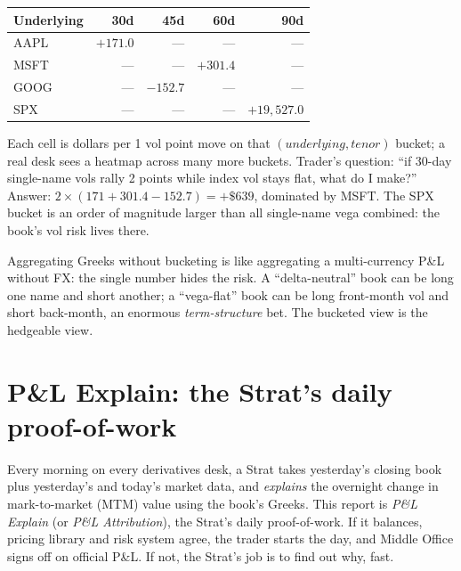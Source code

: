 \begin{center}
\small
\begin{tabular}{@{}lrrrr@{}}
\toprule
Underlying & 30d & 45d & 60d & 90d \\
\midrule
AAPL & $+171.0$ & --- & --- & --- \\
MSFT & --- & --- & $+301.4$ & --- \\
GOOG & --- & $-152.7$ & --- & --- \\
SPX  & --- & --- & --- & $+19{,}527.0$ \\
\bottomrule
\end{tabular}
\end{center}

Each cell is dollars per 1 vol point move on that
$(underlying, tenor)$ bucket; a real desk sees a heatmap across
many more buckets.  Trader's question: ``if 30-day single-name
vols rally 2 points while index vol stays flat, what do I make?''
Answer: $2 \times (171 + 301.4 - 152.7) = +\$639$, dominated by
MSFT.  The SPX bucket is an order of magnitude larger than all
single-name vega combined: the book's vol risk lives there.

\begin{intuitionbox}
Aggregating Greeks without bucketing is like aggregating a
multi-currency P\&L without FX: the single number hides the
risk.  A ``delta-neutral'' book can be long one name and short
another; a ``vega-flat'' book can be long front-month vol and short
back-month, an enormous \emph{term-structure} bet.  The bucketed
view is the hedgeable view.
\end{intuitionbox}


\section{P\&L Explain: the Strat's daily proof-of-work}
\label{sec:pnl_explain}

Every morning on every derivatives desk, a Strat takes yesterday's
closing book plus yesterday's and today's market data, and
\emph{explains} the overnight change in mark-to-market (MTM) value
using the book's Greeks.  This report is \emph{P\&L Explain}
(or \emph{P\&L Attribution}), the Strat's daily proof-of-work.
If it balances, pricing library and risk system agree, the trader
starts the day, and Middle Office signs off on official P\&L.  If
not, the Strat's job is to find out why, fast.

